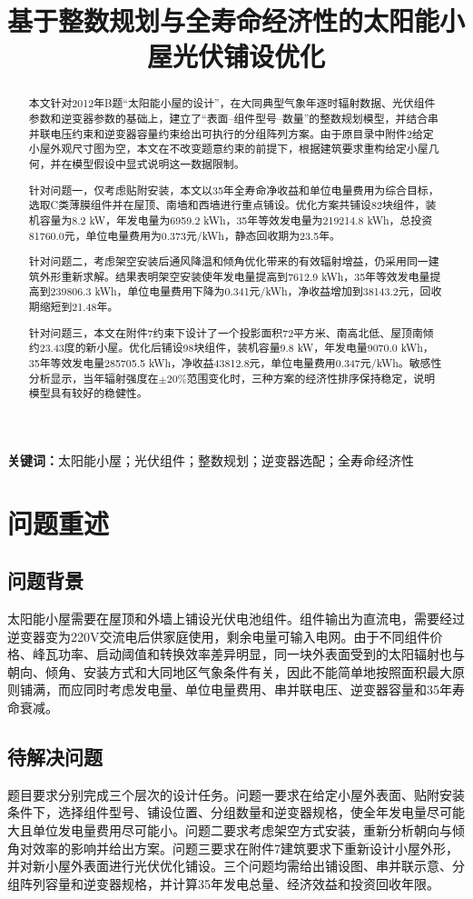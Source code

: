 \documentclass[UTF8,a4paper,12pt]{ctexart}
\title{基于整数规划与全寿命经济性的太阳能小屋光伏铺设优化}
\author{}
\date{}
\begin{document}
\maketitle
\begin{abstract}
本文针对2012年B题“太阳能小屋的设计”，在大同典型气象年逐时辐射数据、光伏组件参数和逆变器参数的基础上，建立了“表面--组件型号--数量”的整数规划模型，并结合串并联电压约束和逆变器容量约束给出可执行的分组阵列方案。由于原目录中附件2给定小屋外观尺寸图为空，本文在不改变题意约束的前提下，根据建筑要求重构给定小屋几何，并在模型假设中显式说明这一数据限制。

针对问题一，仅考虑贴附安装，本文以35年全寿命净收益和单位电量费用为综合目标，选取C类薄膜组件并在屋顶、南墙和西墙进行重点铺设。优化方案共铺设82块组件，装机容量为8.2 kW，年发电量为6959.2 kWh，35年等效发电量为219214.8 kWh，总投资81760.0元，单位电量费用为0.373元/kWh，静态回收期为23.5年。

针对问题二，考虑架空安装后通风降温和倾角优化带来的有效辐射增益，仍采用同一建筑外形重新求解。结果表明架空安装使年发电量提高到7612.9 kWh，35年等效发电量提高到239806.3 kWh，单位电量费用下降为0.341元/kWh，净收益增加到38143.2元，回收期缩短到21.48年。

针对问题三，本文在附件7约束下设计了一个投影面积72平方米、南高北低、屋顶南倾约23.43度的新小屋。优化后铺设98块组件，装机容量9.8 kW，年发电量9070.0 kWh，35年等效发电量285705.5 kWh，净收益43812.8元，单位电量费用0.347元/kWh。敏感性分析显示，当年辐射强度在$\pm20\%$范围变化时，三种方案的经济性排序保持稳定，说明模型具有较好的稳健性。
\end{abstract}
\noindent\textbf{关键词：}太阳能小屋；光伏组件；整数规划；逆变器选配；全寿命经济性
\newpage
\tableofcontents
\newpage

\section{问题重述}
\subsection{问题背景}
太阳能小屋需要在屋顶和外墙上铺设光伏电池组件。组件输出为直流电，需要经过逆变器变为220V交流电后供家庭使用，剩余电量可输入电网。由于不同组件价格、峰瓦功率、启动阈值和转换效率差异明显，同一块外表面受到的太阳辐射也与朝向、倾角、安装方式和大同地区气象条件有关，因此不能简单地按照面积最大原则铺满，而应同时考虑发电量、单位电量费用、串并联电压、逆变器容量和35年寿命衰减。

\subsection{待解决问题}
题目要求分别完成三个层次的设计任务。问题一要求在给定小屋外表面、贴附安装条件下，选择组件型号、铺设位置、分组数量和逆变器规格，使全年发电量尽可能大且单位发电量费用尽可能小。问题二要求考虑架空方式安装，重新分析朝向与倾角对效率的影响并给出方案。问题三要求在附件7建筑要求下重新设计小屋外形，并对新小屋外表面进行光伏优化铺设。三个问题均需给出铺设图、串并联示意、分组阵列容量和逆变器规格，并计算35年发电总量、经济效益和投资回收年限。
\end{document}
